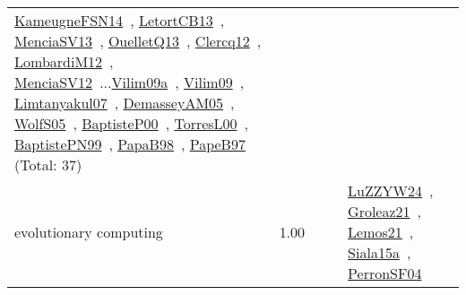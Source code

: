 {\begin{longtable}{p{3cm}r>{\raggedright\arraybackslash}p{6cm}>{\raggedright\arraybackslash}p{6cm}>{\raggedright\arraybackslash}p{8cm}}
\href{../works/KameugneFSN14.pdf}{KameugneFSN14}~\cite{KameugneFSN14}, \href{../works/LetortCB13.pdf}{LetortCB13}~\cite{LetortCB13}, \href{../works/MenciaSV13.pdf}{MenciaSV13}~\cite{MenciaSV13}, \href{../works/OuelletQ13.pdf}{OuelletQ13}~\cite{OuelletQ13}, \href{../works/Clercq12.pdf}{Clercq12}~\cite{Clercq12}, \href{../works/LombardiM12.pdf}{LombardiM12}~\cite{LombardiM12}, \href{../works/MenciaSV12.pdf}{MenciaSV12}~\cite{MenciaSV12}...\href{../works/Vilim09a.pdf}{Vilim09a}~\cite{Vilim09a}, \href{../works/Vilim09.pdf}{Vilim09}~\cite{Vilim09}, \href{../works/Limtanyakul07.pdf}{Limtanyakul07}~\cite{Limtanyakul07}, \href{../works/DemasseyAM05.pdf}{DemasseyAM05}~\cite{DemasseyAM05}, \href{../works/WolfS05.pdf}{WolfS05}~\cite{WolfS05}, \href{../works/BaptisteP00.pdf}{BaptisteP00}~\cite{BaptisteP00}, \href{../works/TorresL00.pdf}{TorresL00}~\cite{TorresL00}, \href{../works/BaptistePN99.pdf}{BaptistePN99}~\cite{BaptistePN99}, \href{../works/PapaB98.pdf}{PapaB98}~\cite{PapaB98}, \href{../works/PapeB97.pdf}{PapeB97}~\cite{PapeB97} (Total: 37)\\
\index{evolutionary computing}\index{Algorithms!evolutionary computing}evolutionary computing &  1.00 &  &  & \href{../works/LuZZYW24.pdf}{LuZZYW24}~\cite{LuZZYW24}, \href{../works/Groleaz21.pdf}{Groleaz21}~\cite{Groleaz21}, \href{../works/Lemos21.pdf}{Lemos21}~\cite{Lemos21}, \href{../works/Siala15a.pdf}{Siala15a}~\cite{Siala15a}, \href{../works/PerronSF04.pdf}{PerronSF04}~\cite{PerronSF04}\\

\end{longtable}}
